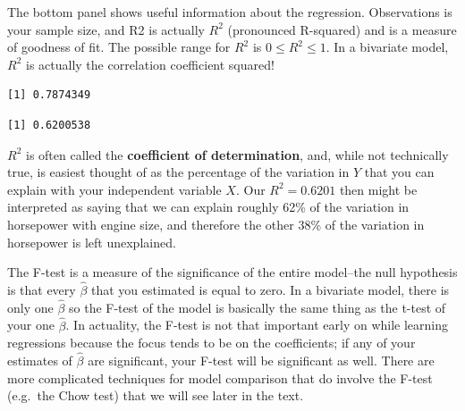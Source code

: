 \documentclass[
  letterpaper,
]{book}
\newenvironment{Shaded}{\begin{snugshade}}{\end{snugshade}}
\newcommand{\DecValTok}[1]{\textcolor[rgb]{0.68,0.00,0.00}{#1}}
\newcommand{\FunctionTok}[1]{\textcolor[rgb]{0.28,0.35,0.67}{#1}}
\newcommand{\NormalTok}[1]{\textcolor[rgb]{0.00,0.23,0.31}{#1}}
\newcommand{\SpecialCharTok}[1]{\textcolor[rgb]{0.37,0.37,0.37}{#1}}
\begin{document}
The bottom panel shows useful information about the regression.
Observations is your sample size, and R2 is actually \(R^2\) (pronounced
R-squared) and is a measure of goodness of fit. The possible range for
\(R^2\) is \(0 \leq R^2 \leq 1\). In a bivariate model, \(R^2\) is
actually the correlation coefficient squared!

\begin{Shaded}
\end{Shaded}

\begin{verbatim}
[1] 0.7874349
\end{verbatim}

\begin{Shaded}
\end{Shaded}

\begin{verbatim}
[1] 0.6200538
\end{verbatim}

\(R^2\) is often called the \textbf{coefficient of determination}, and,
while not technically true, is easiest thought of as the percentage of
the variation in \(Y\) that you can explain with your independent
variable \(X\). Our \(R^2=0.6201\) then might be interpreted as saying
that we can explain roughly 62\% of the variation in horsepower with
engine size, and therefore the other 38\% of the variation in horsepower
is left unexplained.

The F-test is a measure of the significance of the entire model--the
null hypothesis is that every \(\hat{\beta}\) that you estimated is
equal to zero. In a bivariate model, there is only one \(\hat{\beta}\)
so the F-test of the model is basically the same thing as the t-test of
your one \(\hat{\beta}\). In actuality, the F-test is not that important
early on while learning regressions because the focus tends to be on the
coefficients; if any of your estimates of \(\hat{\beta}\) are
significant, your F-test will be significant as well. There are more
complicated techniques for model comparison that do involve the F-test
(e.g.~the Chow test) that we will see later in the text.
\end{document}
